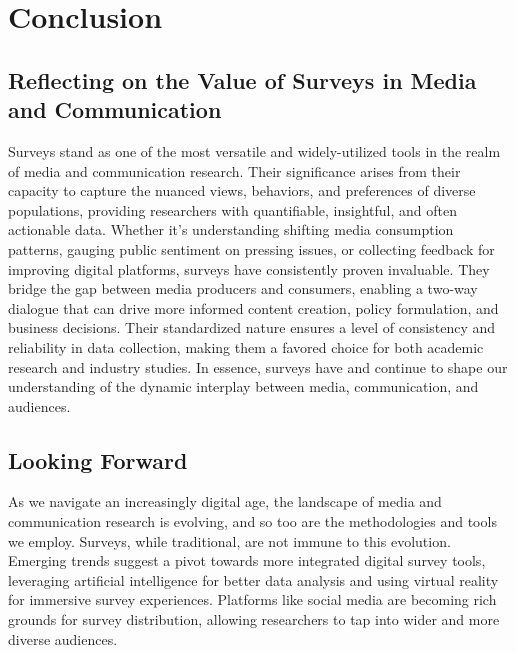 \documentclass[
  b5paper]{book}
\begin{document}
\hypertarget{conclusion-4}{%
\section{Conclusion}\label{conclusion-4}}

\hypertarget{reflecting-on-the-value-of-surveys-in-media-and-communication}{%
\subsection*{Reflecting on the Value of Surveys in Media and Communication}\label{reflecting-on-the-value-of-surveys-in-media-and-communication}}

Surveys stand as one of the most versatile and widely-utilized tools in the realm of media and communication research. Their significance arises from their capacity to capture the nuanced views, behaviors, and preferences of diverse populations, providing researchers with quantifiable, insightful, and often actionable data. Whether it's understanding shifting media consumption patterns, gauging public sentiment on pressing issues, or collecting feedback for improving digital platforms, surveys have consistently proven invaluable. They bridge the gap between media producers and consumers, enabling a two-way dialogue that can drive more informed content creation, policy formulation, and business decisions. Their standardized nature ensures a level of consistency and reliability in data collection, making them a favored choice for both academic research and industry studies. In essence, surveys have and continue to shape our understanding of the dynamic interplay between media, communication, and audiences.

\hypertarget{looking-forward}{%
\subsection*{Looking Forward}\label{looking-forward}}

As we navigate an increasingly digital age, the landscape of media and communication research is evolving, and so too are the methodologies and tools we employ. Surveys, while traditional, are not immune to this evolution. Emerging trends suggest a pivot towards more integrated digital survey tools, leveraging artificial intelligence for better data analysis and using virtual reality for immersive survey experiences. Platforms like social media are becoming rich grounds for survey distribution, allowing researchers to tap into wider and more diverse audiences.
\end{document}
